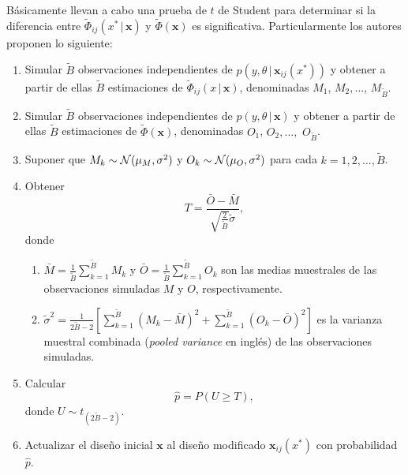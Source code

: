 Básicamente \cite[págs. 4,~6]{Woods_ACE} llevan a cabo una prueba de $t$ de Student para determinar si la diferencia entre $\tilde{\Phi}_{ij}( x^{*} \, | \, \mathbf{x} )$ y $\tilde{\Phi}( \mathbf{x} )$ es significativa. Particularmente los autores proponen lo siguiente:
\begin{enumerate}
\item Simular $\tilde{B}$ observaciones independientes de $p(y, \theta \, | \, \mathbf{x}_{ij}(x^{*}))$ y obtener a partir de ellas $\tilde{B}$ estimaciones de $\tilde{\Phi}_{ij}( x \, | \, \mathbf{x} )$, denominadas $M_1$, $M_2, ...$, $M_{\tilde{B}}$.
\item Simular $\tilde{B}$ observaciones independientes de $p(y, \theta \, | \, \mathbf{x})$ y obtener a partir de ellas $\tilde{B}$ estimaciones de $\tilde{\Phi}( \mathbf{x} )$, denominadas $O_1$, $O_2, ...,$ $O_{\tilde{B}}$.
\item Suponer que $M_k \sim \mathcal{N} (\mu_M, \sigma^2)$ y $O_k \sim \mathcal{N} (\mu_O, \sigma^2)$ para cada \newline $k=1,2,...,\tilde{B}$.
\item Obtener 
\begin{equation} \label{eq:t_test_statistic}
	T = \frac{ \bar{O} - \bar{M} }{ \sqrt{\frac{2}{\tilde{B}}} \tilde{\sigma} },
\end{equation}
donde
	\begin{enumerate}
	\item $\bar{M} = \frac{1}{\tilde{B}} \sum_{k=1}^{\tilde{B}} M_k$ y $\bar{O} = \frac{1}{\tilde{B}} \sum_{k=1}^{\tilde{B}} O_k$ son las medias muestrales de las observaciones simuladas $M$ y $O$, respectivamente.
    \item $\tilde{\sigma}^2 = \frac{1}{ 2\tilde{B} - 2 } \left[ \sum_{k=1}^{\tilde{B}} (M_k - \bar{M})^2 + \sum_{k=1}^{\tilde{B}} (O_k - \bar{O})^2 \right]$ es la varianza muestral combinada (\textit{pooled variance} en inglés) de las observaciones simuladas.
	\end{enumerate}
\item Calcular
\begin{equation} \label{eq:accept_reject_probability}
	\hat{p} = P(U \geq T),
\end{equation}
donde $U \sim t_{(2\tilde{B}-2)}$.
\item Actualizar el diseño inicial $\mathbf{x}$ al diseño modificado $\mathbf{x}_{ij}(x^{*})$ con probabilidad $\hat{p}$. 
\end{enumerate}




